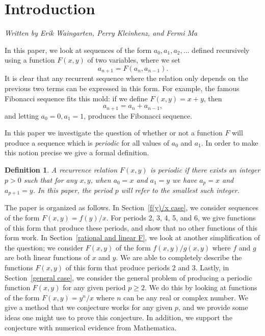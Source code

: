 \documentclass[12pt]{article}
\newtheorem{definition}{Definition}
\begin{document}
\maketitle

\section{Introduction}
\emph{Written by Erik Waingarten, Perry Kleinhenz, and Fermi Ma}

In this paper, we look at sequences of the form $a_0, a_1, a_2, \dots$ defined recursively using a function $F(x,y)$ of two variables, where we set
\begin{equation*}
a_{n+1} = F(a_n, a_{n-1}).
\end{equation*}
It is clear that any recurrent sequence where the relation only depends on the previous two terms can be expressed in this form. For example, the famous Fibonacci sequence fits this mold: if we define $F(x,y) = x + y$, then 
\begin{equation*}
a_{n+1} = a_n + a_{n-1},
\end{equation*}
and letting $a_0 =0 , a_1 = 1$, produces the Fibonacci sequence. 

In this paper we investigate the question of whether or not a function $F$ will produce a sequence which is \emph{periodic} for all values of $a_0$ and $a_1$. In order to make this notion precise we give a formal definition.
\begin{definition}
A recurrence relation $F(x,y)$ is \textit{periodic} if there exists an integer $p>0$ such that for any $x,y$, when $a_0 = x$ and $a_1 = y$ we have $a_p = x$ and $a_{p+1} = y$. In this paper, the period $p$ will refer to the smallest such integer.
\end{definition}

The paper is organized as follows. In Section~\ref{f(y)/x case}, we consider sequences of the form $F(x,y) = f(y)/x$. For periods 2, 3, 4, 5, and 6, we give functions of this form that produce these periods, and show that no other functions of this form work. In Section~\ref{rational and linear F}, we look at another simplification of the question; we consider $F(x,y)$ of the form $f(x,y)/g(x,y)$ where $f$ and $g$ are both linear functions of $x$ and $y$. We are able to completely describe the functions $F(x,y)$ of this form that produce periods 2 and 3. Lastly, in Section~\ref{general case}, we consider the general problem of producing a periodic function $F(x,y)$ for any given period $p \geq 2$. We do this by looking at functions of the form $F(x,y) = y^n/x$ where $n$ can be any real or complex number. We give a method that we conjecture works for any given $p$, and we provide some ideas one might use to prove this conjecture. In addition, we support the conjecture with numerical evidence from Mathematica.
\end{document}
